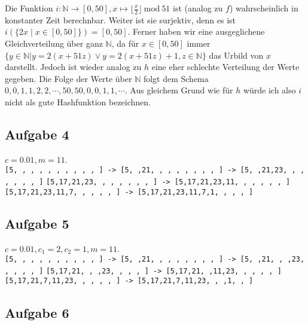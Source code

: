 \documentclass[a4paper,graphics,11pt]{article}
\newcommand{\aufgabe}[1]{\subsection*{Aufgabe #1}}
\begin{document}
Die Funktion $i: \mathbb{N} \to [0,50], x \mapsto \lfloor \frac{x}{2} \rfloor\ \text{mod}\ 51$ ist (analog zu $f$) wahrscheinlich
in konstanter Zeit berechnbar. Weiter ist sie surjektiv, denn
es ist $i(\{2x \mid x \in [0,50]\}) = [0,50]$. Ferner haben wir eine ausgeglichene Gleichverteilung über ganz $\mathbb{N}$,
da für $x \in [0,50]$ immer\\ $\{y \in \mathbb{N}| y=2(x+51z) \lor y=2(x+51z)+1, z \in \mathbb{N}\}$ das Urbild
von $x$ darstellt. Jedoch ist wieder analog zu $h$ eine eher schlechte Verteilung der Werte gegeben. Die Folge der Werte
über $\mathbb{N}$ folgt dem Schema $0,0,1,1,2,2,\cdots,50,50,0,0,1,1,\cdots$. Aus gleichem Grund wie für $h$ würde ich
also $i$ nicht als gute Hashfunktion bezeichnen.

\aufgabe{4}
$c = 0.01, m = 11$.\\
\texttt{[5, , , , , , , , , , ] -> [5, ,21, , , , , , , , ] -> [5, ,21,23, , , , , , , ]}
\texttt{[5,17,21,23, , , , , , , ] -> [5,17,21,23,11, , , , , , ]}\\
\texttt{[5,17,21,23,11,7, , , , , ] -> [5,17,21,23,11,7,1, , , , ]}

\aufgabe{5}
$c = 0.01, c_1 = 2, c_2 =1, m = 11$.\\
\texttt{[5, , , , , , , , , , ] -> [5, ,21, , , , , , , , ] -> [5, ,21, , ,23, , , , , ]}
\texttt{[5,17,21, , ,23, , , , ] -> [5,17,21, ,11,23, , , , , ]}\\
\texttt{[5,17,21,7,11,23, , , , , ] -> [5,17,21,7,11,23, , ,1, , ]}

\aufgabe{6}


\end{document}
